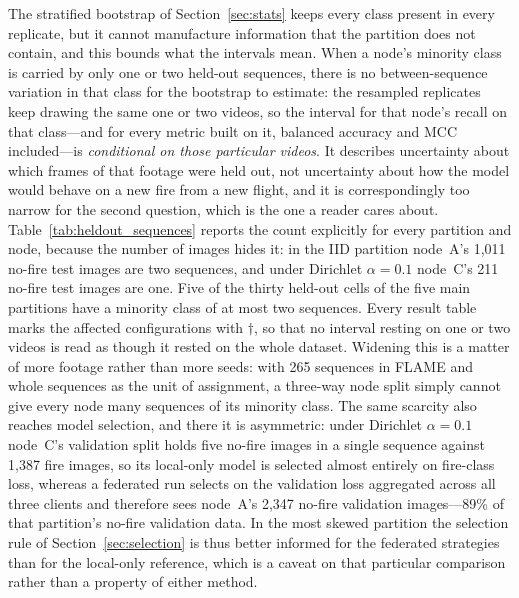 \documentclass[journal]{IEEEtran}
\begin{document}
The stratified bootstrap of Section~\ref{sec:stats} keeps every class present in every replicate, but it cannot manufacture information that the partition does not contain, and this bounds what the intervals mean. When a node's minority class is carried by only one or two held-out sequences, there is no between-sequence variation in that class for the bootstrap to estimate: the resampled replicates keep drawing the same one or two videos, so the interval for that node's recall on that class---and for every metric built on it, balanced accuracy and MCC included---is \emph{conditional on those particular videos}. It describes uncertainty about which frames of that footage were held out, not uncertainty about how the model would behave on a new fire from a new flight, and it is correspondingly too narrow for the second question, which is the one a reader cares about. Table~\ref{tab:heldout_sequences} reports the count explicitly for every partition and node, because the number of images hides it: in the IID partition node~A's 1{,}011 no-fire test images are two sequences, and under Dirichlet $\alpha{=}0.1$ node~C's 211 no-fire test images are one. Five of the thirty held-out cells of the five main partitions have a minority class of at most two sequences. Every result table marks the affected configurations with $\dagger$, so that no interval resting on one or two videos is read as though it rested on the whole dataset. Widening this is a matter of more footage rather than more seeds: with 265 sequences in FLAME and whole sequences as the unit of assignment, a three-way node split simply cannot give every node many sequences of its minority class. The same scarcity also reaches model selection, and there it is asymmetric: under Dirichlet $\alpha{=}0.1$ node~C's validation split holds five no-fire images in a single sequence against 1{,}387 fire images, so its local-only model is selected almost entirely on fire-class loss, whereas a federated run selects on the validation loss aggregated across all three clients and therefore sees node~A's 2{,}347 no-fire validation images---89\% of that partition's no-fire validation data. In the most skewed partition the selection rule of Section~\ref{sec:selection} is thus better informed for the federated strategies than for the local-only reference, which is a caveat on that particular comparison rather than a property of either method.
\end{document}
